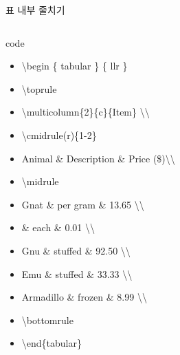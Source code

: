 \documentclass[ aspectratio=149,  14pt,blue,xcolor=pdftex,dvipsnames,table,handout,notes]{beamer}
\begin{document}
\begin{frame}[t]{표 내부 줄치기}
\begin{columns}[t]
		\begin{column}{.5\textwidth}
				\begin{block}{code}
				\begin{itemize}
				\item[] \textbackslash begin \{ tabular \} \{ llr \}
				\item[] \textbackslash toprule
				\item[] \textbackslash multicolumn\{2\}\{c\}\{Item\} \textbackslash \textbackslash 
				\item[] \textbackslash cmidrule(r)\{1-2\}
				\item[] Animal \& Description \& Price (\$)\textbackslash \textbackslash 
				\item[] \textbackslash midrule
				\item[] Gnat \& per gram \& 13.65 \textbackslash \textbackslash 
				\item[] \& each \& 0.01 \textbackslash \textbackslash 
				\item[] Gnu \& stuffed \& 92.50 \textbackslash \textbackslash 
				\item[] Emu \& stuffed \& 33.33 \textbackslash \textbackslash 
				\item[] Armadillo \& frozen \& 8.99 \textbackslash \textbackslash 
				\item[] \textbackslash bottomrule
				\item[] \textbackslash end\{tabular\}
				\end{itemize}
				\end{block}
		\end{column}

		\end{columns}
		
		\end{frame}
\end{document}
